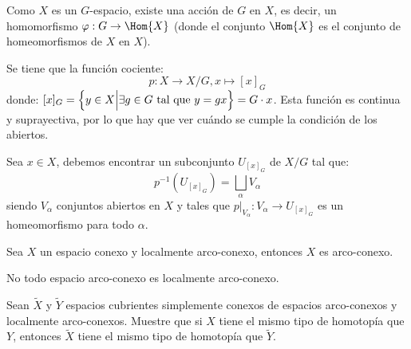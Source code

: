 \documentclass[12pt]{report}
\theoremstyle{largebreak}
\newcommand\cf[3]{\ensuremath{#1:#2\rightarrow#3}}
\begin{document}
    \begin{sol}
        Como $X$ es un $G$-espacio, existe una acción de $G$ en $X$, es decir, un homomorfismo $\cf{\varphi}{G}{\Hom{X}}$ (donde el conjunto $\Hom{X}$ es el conjunto de homeomorfismos de $X$ en $X$).

        Se tiene que la función cociente:
        \begin{equation*}
            \cf{p}{X}{X/G},x\mapsto [x]_G
        \end{equation*}
        donde: $[x]_G=\left\{y\in X\Big|\exists g\in G\textup{ tal que }y=gx \right\}=G\cdot x$. Esta función es continua y suprayectiva, por lo que hay que ver cuándo se cumple la condición de los abiertos.

        Sea $x\in X$, debemos encontrar un subconjunto $U_{[x]_G}$ de $X/G$ tal que:
        \begin{equation*}
            p^{-1}(U_{[x]_G})=\bigsqcup_{\alpha}V_\alpha
        \end{equation*}
        siendo $V_\alpha$ conjuntos abiertos en $X$ y tales que $\cf{p\big|_{ V_\alpha}}{V_\alpha}{U_{[x]_G}}$ es un homeomorfismo para todo $\alpha$.
    \end{sol}

    \begin{propo}
        Sea $X$ un espacio conexo y localmente arco-conexo, entonces $X$ es arco-conexo.
    \end{propo}

    \begin{obs}
        No todo espacio arco-conexo es localmente arco-conexo.
    \end{obs}

    \begin{excer}
        Sean $\widetilde{X}$ y $\widetilde{Y}$ espacios cubrientes simplemente conexos de espacios arco-conexos y localmente arco-conexos. Muestre que si $X$ tiene el mismo tipo de homotopía que $Y$, entonces $\widetilde{X}$ tiene el mismo tipo de homotopía que $\widetilde{Y}$.
    \end{excer}
\end{document}
